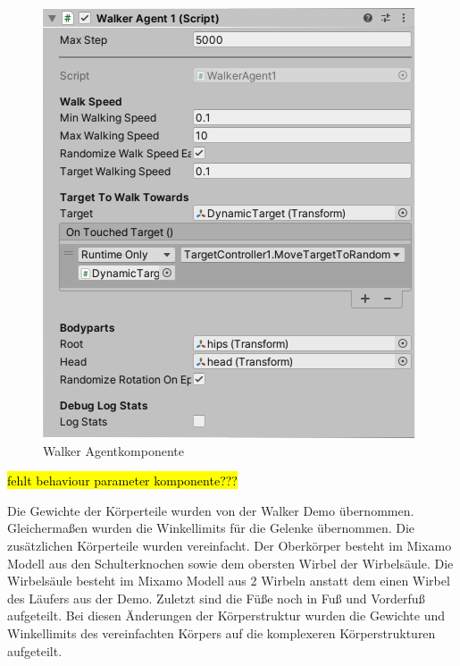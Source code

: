 \begin{figure}[H]
  \centering  
  \includegraphics[scale=0.5]{img/komponente_agent_walker1}
  \caption{Walker Agentkomponente}
  \label{fig:komponente_agent_walker1}
\end{figure}

\hl{fehlt behaviour parameter komponente???}

Die Gewichte der Körperteile wurden von der Walker Demo übernommen. Gleichermaßen wurden die Winkellimits für die Gelenke übernommen. Die zusätzlichen Körperteile wurden vereinfacht. Der Oberkörper besteht im Mixamo Modell aus den Schulterknochen sowie dem obersten Wirbel der Wirbelsäule. Die Wirbelsäule besteht im Mixamo Modell aus 2 Wirbeln anstatt dem einen Wirbel des Läufers aus der Demo. Zuletzt sind die Füße noch in Fuß und Vorderfuß aufgeteilt. Bei diesen Änderungen der Körperstruktur wurden die Gewichte und Winkellimits des vereinfachten Körpers auf die komplexeren Körperstrukturen aufgeteilt.

